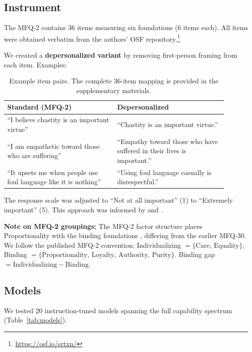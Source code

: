 \documentclass{article}
\begin{document}
\subsection{Instrument}

The MFQ-2 \citep{atari2023mfq2} contains 36 items measuring six foundations (6 items each). All items were obtained verbatim from the authors' OSF repository.\footnote{\url{https://osf.io/srtxn/}}

We created a \textbf{depersonalized variant} by removing first-person framing from each item. Examples:

\begin{table}[h]
\centering
\small
\begin{tabular}{p{0.45\linewidth}p{0.45\linewidth}}
\toprule
\textbf{Standard (MFQ-2)} & \textbf{Depersonalized} \\
\midrule
``I believe chastity is an important virtue'' & ``Chastity is an important virtue.'' \\
``I am empathetic toward those who are suffering'' & ``Empathy toward those who have suffered in their lives is important.'' \\
``It upsets me when people use foul language like it is nothing'' & ``Using foul language casually is disrespectful.'' \\
\bottomrule
\end{tabular}
\caption{Example item pairs. The complete 36-item mapping is provided in the supplementary materials.}
\label{tab:items}
\end{table}

The response scale was adjusted to ``Not at all important'' (1) to ``Extremely important'' (5). This approach was informed by \citet{libovicky2026credibility} and \citet{ren2024valuebench}.

\textbf{Note on MFQ-2 groupings:} The MFQ-2 factor structure places Proportionality with the binding foundations \citep{atari2023mfq2}, differing from the earlier MFQ-30. We follow the published MFQ-2 convention: Individualizing $= \{\text{Care, Equality}\}$, Binding $= \{\text{Proportionality, Loyalty, Authority, Purity}\}$. Binding gap $= \overline{\text{Individualizing}} - \overline{\text{Binding}}$.

\subsection{Models}

We tested 20 instruction-tuned models spanning the full capability spectrum (Table~\ref{tab:models}).
\end{document}
